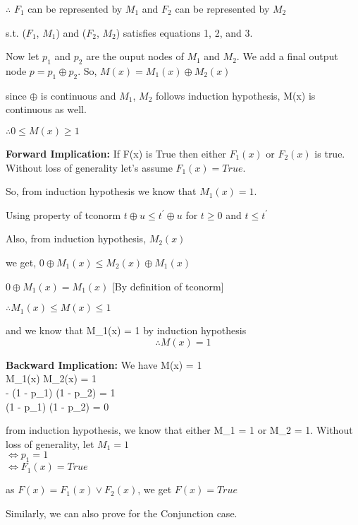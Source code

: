 $\therefore$ $F_1$ can be represented by $M_1$ and $F_2$ can be represented by $M_2$

s.t. ($F_1$, $M_1$) and ($F_2$, $M_2$) satisfies equations 1, 2, and 3.

Now let $p_1$ and $p_2$ are the ouput nodes of $M_1$ and $M_2$. We add a final output node $p = p_1 \oplus p_2$.
So, $M(x) = M_1(x) \oplus M_2(x)$

since $\oplus$ is continuous and $M_1$, $M_2$ follows induction hypothesis,
M(x) is continuous as well.

$\therefore 0 \leq M(x) \geq 1$

\noindent\textbf{Forward Implication: } If F(x) is True then either $F_1(x)$ or $F_2(x)$
is true. Without loss of generality let's assume $F_1(x) = True$.

So, from induction hypothesis we know that $M_1(x) = 1$.

Using property of tconorm $t \oplus u \leq t^{'} \oplus u$ for $t \geq 0$ and $t \leq t^{'}$ 

Also, from induction hypothesis, $M_2(x)$ 

we get, $0 \oplus M_1(x) \leq M_2(x) \oplus M_1(x)$

$0 \oplus M_1(x) = M_1(x)$ [By definition of tconorm]

$\therefore M_1(x) \leq M(x) \leq 1$

and we know that M_1(x) = 1 by induction hypothesis
$$\therefore M(x) = 1$$

\noindent\textbf{Backward Implication: } We have M(x) = 1 \\
\iff M_1(x) \oplus M_2(x) = 1 \\
 - (1 - p_1) \otimes (1 - p_2) = 1 \\
\iff (1 - p_1) \otimes (1 - p_2) = 0

from induction hypothesis, we know that either M_1 = 1 or M_2 = 1. Without loss of generality, 
let $M_1 = 1$ \\
$\iff p_1 = 1$ \\
$\iff F_1(x) = True$

as $F(x) = F_1(x) \lor F_2(x)$, we get
$F(x) = True$

Similarly, we can also prove for the Conjunction case.
